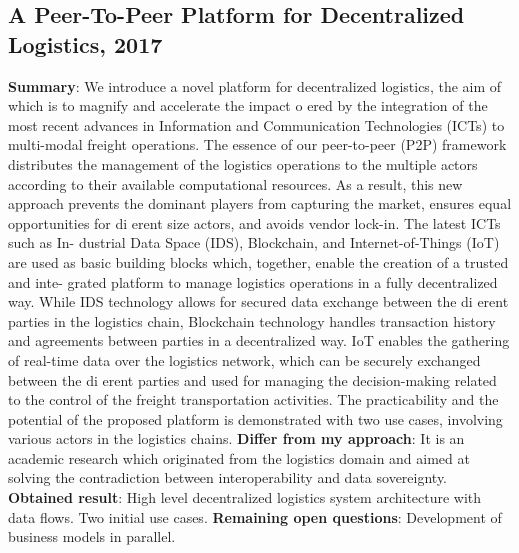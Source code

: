 \documentclass[11pt]{article}
\begin{document}
\subsection{A Peer-To-Peer Platform for Decentralized Logistics, 2017 \cite{peer-to-peerDecentralizedLogistics}}
\textbf{Summary}: We introduce a novel platform for decentralized logistics, the aim of which is to magnify and accelerate the impact o ered by the integration of the most recent advances in Information and Communication Technologies (ICTs) to multi-modal freight operations. The essence of our peer-to-peer (P2P) framework distributes the management of the logistics operations to the multiple actors according to their available computational resources. As a result, this new approach prevents the dominant players from capturing the market, ensures equal opportunities for di erent size actors, and avoids vendor lock-in. The latest ICTs such as In- dustrial Data Space (IDS), Blockchain, and Internet-of-Things (IoT) are used as basic building blocks which, together, enable the creation of a trusted and inte- grated platform to manage logistics operations in a fully decentralized way. While IDS technology allows for secured data exchange between the di erent parties in the logistics chain, Blockchain technology handles transaction history and agreements between parties in a decentralized way. IoT enables the gathering of real-time data over the logistics network, which can be securely exchanged between the di erent parties and used for managing the decision-making related to the control of the freight transportation activities. The practicability and the potential of the proposed platform is demonstrated with two use cases, involving various actors in the logistics chains.\newline
\textbf{Differ from my approach}: It is an academic research which originated from the logistics domain and aimed at solving the contradiction between interoperability and data sovereignty.\newline
\textbf{Obtained result}: High level decentralized logistics system architecture with data flows. Two initial use cases.\newline
\textbf{Remaining open questions}: Development of business models in parallel.\newline
\end{document}
